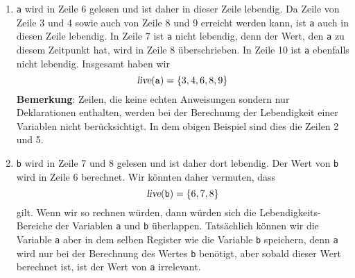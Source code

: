 \begin{enumerate}
\item \texttt{a} wird in Zeile 6 gelesen und ist daher in dieser Zeile lebendig.  
      Da Zeile von Zeile 3 und 4 sowie auch von Zeile 8 und 9
      erreicht werden kann, ist \texttt{a} auch in diesen Zeile lebendig.  In Zeile
      7 ist \texttt{a} nicht lebendig, denn der Wert, den \texttt{a} zu diesem Zeitpunkt
      hat, wird in Zeile 8 \"uberschrieben.  In Zeile 10 ist \texttt{a} ebenfalls nicht
      lebendig.  Insgesamt haben wir
      \[ \textsl{live}(\mathtt{a}) = \{ 3, 4, 6, 8, 9 \} \]
      \textbf{Bemerkung}:  Zeilen, die keine echten Anweisungen sondern nur Deklarationen
      enthalten, werden bei der Berechnung der Lebendigkeit einer Variablen nicht
      ber\"ucksichtigt.
      In dem obigen Beispiel sind dies die Zeilen 2 und 5.
\item \texttt{b} wird in Zeile 7 und 8 gelesen und ist daher dort lebendig.  Der Wert von
      \texttt{b} wird in Zeile 6 berechnet.  Wir k\"onnten daher vermuten, dass 
      \[ \textsl{live}(\mathtt{b}) = \{ 6, 7, 8 \} \]
      gilt.  Wenn wir so rechnen w\"urden, dann  w\"urden sich die Lebendigkeits-Bereiche
      der Variablen \texttt{a} und \texttt{b} \"uberlappen.  Tats\"achlich k\"onnen wir die
      Variable \texttt{a} aber in dem selben Register wie die Variable \texttt{b}
      speichern, denn \texttt{a} wird nur bei der Berechnung des Wertes \texttt{b}
      ben\"otigt, aber sobald dieser Wert berechnet ist, ist der Wert von \texttt{a}
      irrelevant.


\end{enumerate}
